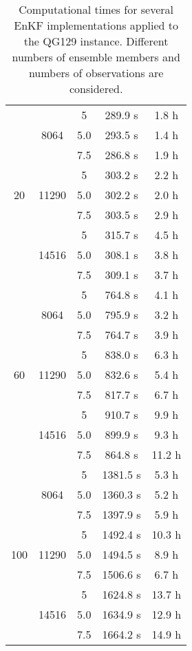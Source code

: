 \documentclass[12pt]{article}
\begin{document}
\begin{table}[H]
\centering
{\footnotesize
\begin{tabular}{|c|c|c|c|c|} \hline
 &  &  &  &  \\ \hline

\multirow{9}{*}{20} &  \multirow{3}{*}{8064}  & 5 & 289.9 s & 1.8 h \\
& & 5.0 & 293.5 s & 1.4 h \\ 
& & 7.5 & 286.8 s &  1.9 h  \\ 
\cline{2-5}
&  \multirow{3}{*}{11290}  & 5 & 303.2 s & 2.2 h  \\
& & 5.0 & 302.2 s & 2.0 h   \\ 
& & 7.5 & 303.5 s &  2.9  h  \\ 
\cline{2-5}
&  \multirow{3}{*}{14516}  & 5 & 315.7 s & 4.5 h  \\
& & 5.0 & 308.1 s & 3.8 h  \\ 
& & 7.5 & 309.1 s &   3.7 h  \\ 
\cline{1-5}
\multirow{9}{*}{60} &  \multirow{3}{*}{8064}  & 5 & 764.8 s & 4.1 h \\
& & 5.0 & 795.9 s &  3.2 h   \\ 
& & 7.5 & 764.7 s & 3.9 h   \\ 
\cline{2-5}
&  \multirow{3}{*}{11290}  & 5 & 838.0 s &  6.3 h \\
& & 5.0 & 832.6 s & 5.4 h  \\ 
& & 7.5 & 817.7 s & 6.7 h   \\ 
\cline{2-5}
&  \multirow{3}{*}{14516}  & 5 & 910.7 s &  9.9 h  \\
& & 5.0 & 899.9 s &  9.3 h   \\ 
& & 7.5 & 864.8 s &  11.2 h   \\ 
\cline{1-5}
\multirow{9}{*}{100} &  \multirow{3}{*}{8064}  & 5 & 1381.5 s & 5.3 h \\
& & 5.0 & 1360.3 s & 5.2 h  \\ 
& & 7.5 & 1397.9 s & 5.9 h   \\ 
\cline{2-5}
&  \multirow{3}{*}{11290}  & 5 & 1492.4 s & 10.3 h  \\
& & 5.0 & 1494.5 s &  8.9 h   \\ 
& & 7.5 & 1506.6 s & 6.7 h   \\ 
\cline{2-5}
&  \multirow{3}{*}{14516}  & 5 & 1624.8 s & 13.7 h  \\
& & 5.0 & 1634.9 s & 12.9 h   \\ 
& & 7.5 & 1664.2 s & 14.9 h   \\ 
\hline
\end{tabular}
}
\caption{Computational times for several EnKF implementations applied to the QG129 instance.
Different numbers of ensemble members and numbers of observations are considered.}
\label{Tab:QG129-Results-ElapsedTime}
\end{table}
\end{document}

